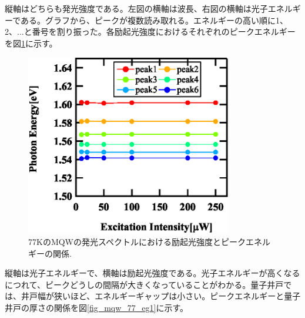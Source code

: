 \documentclass[11pt,a4j]{jsarticle}
\begin{document}
\begin{enumerate}
\begin{figure}[ht]
       \end{figure}


       縦軸はどちらも発光強度である。左図の横軸は波長、右図の横軸は光子エネルギーである。グラフから、ピークが複数読み取れる。エネルギーの高い順に1、2、...と番号を割り振った。各励起光強度におけるそれぞれのピークエネルギーを図\ref{fig_mqw_77_peak1}に示す。

       \begin{figure}[ht]
        \centering
        \includegraphics[clip,width=9cm]{start2_MQW_77K_Peak.eps}
        \caption{77KのMQWの発光スペクトルにおける励起光強度とピークエネルギーの関係.}
        \label{fig_mqw_77_peak1}
       \end{figure}

       \newpage



       縦軸は光子エネルギーで、横軸は励起光強度である。光子エネルギーが高くなるにつれて、ピークどうしの間隔が大きくなっていることがわかる。量子井戸では、井戸幅が狭いほど、エネルギーギャップは小さい。ピークエネルギーと量子井戸の厚さの関係を図\ref{fig_mqw_77_eg1}に示す。

       \newpage


\end{enumerate}
\end{document}
